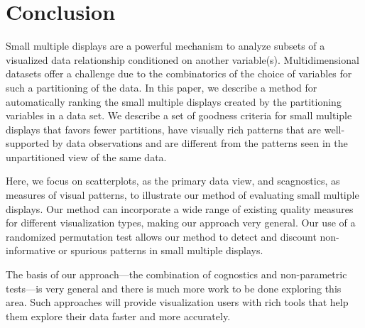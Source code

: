 \section{Conclusion}

Small multiple displays are a powerful mechanism to analyze subsets of a visualized data relationship conditioned on another variable(s). Multidimensional datasets offer a challenge due to the combinatorics of the choice of variables for such a partitioning of the data. In this paper, we describe a method for automatically ranking the small multiple displays created by the partitioning variables in a data set. We describe a set of goodness criteria for small multiple displays that favors fewer partitions, have visually rich patterns that are well-supported by data observations and are different from the patterns seen in the unpartitioned view of the same data.

Here, we focus on scatterplots, as the primary data view, and scagnostics, as measures of visual patterns, to illustrate our method of evaluating small multiple displays. Our method can incorporate a wide range of existing quality measures for different visualization types, making our approach very general. Our use of a randomized permutation test allows our method to detect and discount non-informative or spurious patterns in small multiple displays.

The basis of our approach---the combination of cognostics and non-parametric tests---is very general and there is much more work to be done exploring this area. Such approaches will provide visualization users with rich tools that help them explore their data faster and more accurately.
